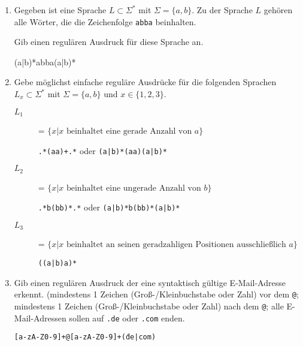 \documentclass{lehramt-informatik-aufgabe}
\begin{document}
\begin{enumerate}

%

\item Gegeben ist eine Sprache $L \subset \Sigma^*$ mit $\Sigma =
\{a,b\}$. Zu der Sprache $L$ gehören alle Wörter, die die Zeichenfolge
\texttt{abba} beinhalten.

Gib einen regulären Ausdruck für diese Sprache an.

\begin{liAntwort}
(a|b)*abba(a|b)*
\end{liAntwort}

%

\item Gebe möglichst einfache reguläre Ausdrücke für die folgenden
Sprachen $L_x \subset \Sigma^*$ mit $\Sigma = \{a,b\}$ und $x \in \{1, 2, 3\}$.

\begin{description}
\item[$L_1$] = $\{ x | x \text{ beinhaltet eine gerade Anzahl von } a \}$

\begin{liAntwort}
\texttt{.*(aa)+.*} oder \texttt{(a|b)*(aa)(a|b)*}
\end{liAntwort}

\item[$L_2$] = $\{ x | x \text{ beinhaltet eine ungerade Anzahl von } b \}$

\begin{liAntwort}
\texttt{.*b(bb)*.*} oder \texttt{(a|b)*b(bb)*(a|b)*}
\end{liAntwort}

\item[$L_3$] = $\{ x | x \text{ beinhaltet an seinen geradzahligen Positionen ausschließlich } a \}$

\begin{liAntwort}
\texttt{((a|b)a)*}
\end{liAntwort}
\end{description}

%

\item Gib einen regulären Ausdruck der eine syntaktisch gültige
E-Mail-Adresse erkennt. (mindestens 1 Zeichen (Groß-/Kleinbuchstabe oder
Zahl) vor dem \texttt{@}; mindestens 1 Zeichen (Groß-/Kleinbuchstabe
oder Zahl) nach dem \texttt{@}; alle E-Mail-Adressen sollen auf
\texttt{.de} oder \texttt{.com} enden.

\begin{liAntwort}
\texttt{[a-zA-Z0-9]+@[a-zA-Z0-9]+\.(de|com)}
\end{liAntwort}
\end{enumerate}
\end{document}
